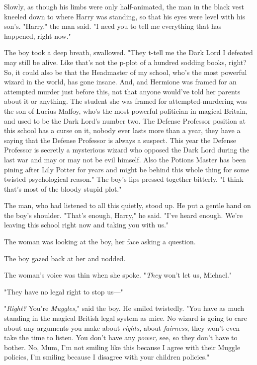 Slowly, as though his limbs were only half-animated, the man in the black vest
kneeled down to where Harry was standing, so that his eyes were level with his
son's. "Harry," the man said. "I need you to tell me everything that has
happened, right now."

The boy took a deep breath, swallowed. "They t-tell me the Dark Lord I defeated
may still be alive. Like that's not the p-plot of a hundred sodding books,
right? So, it could also be that the Headmaster of my school, who's the most
powerful wizard in the world, has gone insane. And, and Hermione was framed for
an attempted murder just before this, not that anyone would've told her parents
about it or anything. The student she was framed for attempted-murdering was
the son of Lucius Malfoy, who's the most powerful politician in magical
Britain, and used to be the Dark Lord's number two. The Defense Professor
position at this school has a curse on it, nobody ever lasts more than a year,
they have a saying that the Defense Professor is always a suspect. This year
the Defense Professor is secretly a mysterious wizard who opposed the Dark Lord
during the last war and may or may not be evil himself. Also the Potions Master
has been pining after Lily Potter for years and might be behind this whole
thing for some twisted psychological reason." The boy's lips pressed together
bitterly. "I think that's most of the bloody stupid plot."

The man, who had listened to all this quietly, stood up. He put a gentle hand
on the boy's shoulder. "That's enough, Harry," he said. "I've heard enough.
We're leaving this school right now and taking you with us."

The woman was looking at the boy, her face asking a question.

The boy gazed back at her and nodded.

The woman's voice was thin when she spoke. "\emph{They} won't let us, Michael."

"They have no legal right to stop us—"

"\emph{Right?} You're \emph{Muggles,}" said the boy. He smiled twistedly. "You
have as much standing in the magical British legal system as mice. No wizard is
going to care about any arguments you make about \emph{rights,} about
\emph{fairness}, they won't even take the time to listen. You don't have any
\emph{power,} see, so they don't have to bother. No, Mum, I'm not smiling like
this because I agree with their Muggle policies, I'm smiling because I disagree
with your children policies."

